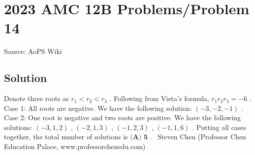 \documentclass[12pt]{article}
\begin{document}
\section*{{2023 AMC 12B Problems/Problem 14}}
Source: AoPS Wiki

\subsection*{Solution}
Denote three roots as $r_1 < r_2 < r_3$ .
Following from Vieta's formula, $r_1r_2r_3 = -6$ . Case 1: All roots are negative. We have the following solution: $\left( -3, -2, -1 \right)$ . Case 2: One root is negative and two roots are positive. We have the following solutions: $\left( -3, 1, 2 \right)$ , $\left( -2, 1, 3 \right)$ , $\left( -1, 2, 3 \right)$ , $\left( -1, 1, 6 \right)$ . Putting all cases together, the total number of solutions is $\boxed{\textbf{(A) 5}}$ . ~Steven Chen (Professor Chen Education Palace, www.professorchenedu.com)
\end{document}
